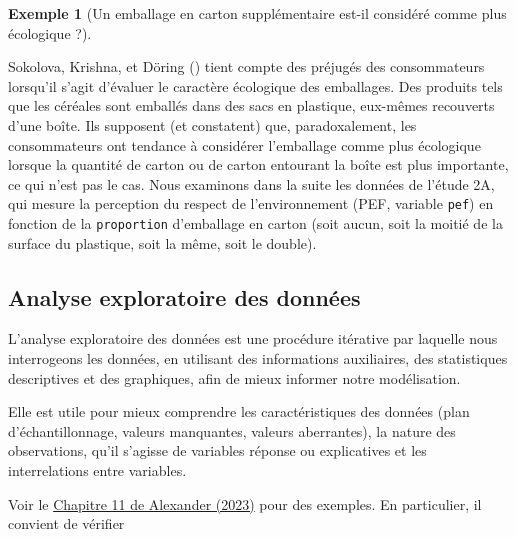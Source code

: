 \documentclass[
  11pt,
  letterpaper,
]{scrbook}
\theoremstyle{plain}
\theoremstyle{plain}
\theoremstyle{definition}
\newtheorem{example}{Exemple}[chapter]
\theoremstyle{definition}
\theoremstyle{remark}
\begin{document}
\begin{example}[Un emballage en carton supplémentaire est-il considéré
comme plus écologique
?]\protect\hypertarget{exm-sokolova}{}\label{exm-sokolova}

Sokolova, Krishna, et Döring () tient
compte des préjugés des consommateurs lorsqu'il s'agit d'évaluer le
caractère écologique des emballages. Des produits tels que les céréales
sont emballés dans des sacs en plastique, eux-mêmes recouverts d'une
boîte. Ils supposent (et constatent) que, paradoxalement, les
consommateurs ont tendance à considérer l'emballage comme plus
écologique lorsque la quantité de carton ou de carton entourant la boîte
est plus importante, ce qui n'est pas le cas. Nous examinons dans la
suite les données de l'étude 2A, qui mesure la perception du respect de
l'environnement (PEF, variable \texttt{pef}) en fonction de la
\texttt{proportion} d'emballage en carton (soit aucun, soit la moitié de
la surface du plastique, soit la même, soit le double).

\end{example}

\subsection{Analyse exploratoire des
données}\label{analyse-exploratoire-des-donnuxe9es}

L'analyse exploratoire des données est une procédure itérative par
laquelle nous interrogeons les données, en utilisant des informations
auxiliaires, des statistiques descriptives et des graphiques, afin de
mieux informer notre modélisation.

Elle est utile pour mieux comprendre les caractéristiques des données
(plan d'échantillonnage, valeurs manquantes, valeurs aberrantes), la
nature des observations, qu'il s'agisse de variables réponse ou
explicatives et les interrelations entre variables.

Voir le \href{https://tellingstorieswithdata.com/11-eda.html}{Chapitre
11 de Alexander (2023)} pour des exemples. En particulier, il convient
de vérifier
\end{document}
